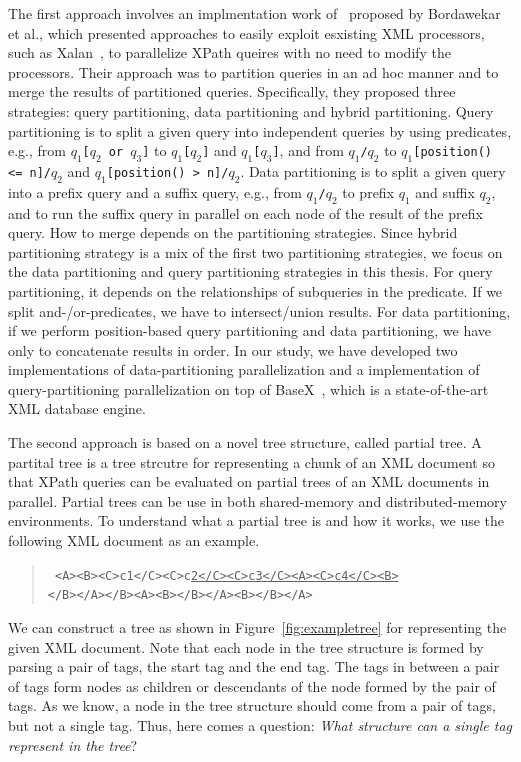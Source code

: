 The first approach involves an implmentation work of~\cite{BoLS09} proposed by
Bordawekar et al., which presented approaches to easily exploit esxisting XML
processors, such as Xalan~\cite{xalan}, to parallelize XPath queires with no
need to modify  the processors. Their approach was to partition queries in an ad
hoc manner and to merge the results of partitioned queries. Specifically, they
proposed three strategies: query partitioning, data partitioning and hybrid
partitioning. Query partitioning is to split a given query into independent
queries by using predicates, e.g., from \texttt{$q_1$[$q_2$ or $q_3$]} to
\texttt{$q_1$[$q_2$]} and \texttt{$q_1$[$q_3$]}, and from \texttt{$q_1$/$q_2$}
to \texttt{$q_1$[position() <= n]/$q_2$} and \texttt{$q_1$[position() >
n]/$q_2$}. Data partitioning is to split a given query into a prefix query and a
suffix query, e.g., from \texttt{$q_1$/$q_2$} to prefix $q_1$ and suffix $q_2$,
and to run the suffix query in parallel on each node of the result of the prefix
query. How to merge depends on the partitioning strategies.  Since hybrid
partitioning strategy is a mix of the first two partitioning strategies, we
focus on the data partitioning and query partitioning strategies in this thesis.
For query partitioning, it depends on the relationships of subqueries in the
predicate. If we split and-/or-predicates, we have to intersect/union results.
For data partitioning, if we perform position-based query partitioning and data
partitioning, we have only to concatenate results in order. In our study, we
have developed two implementations of data-partitioning parallelization and a
implementation of query-partitioning parallelization on top of
BaseX~\cite{basex864}, which is a state-of-the-art XML database engine.

The second approach is based on a novel tree structure, called partial tree. A
partital tree is a tree strcutre for representing a chunk of an XML document so
that XPath queries can be evaluated on partial trees of an XML documents in
parallel. Partial trees can be use in both shared-memory and distributed-memory
environments. To understand what a partial tree is and how it works, we use the
following XML document as an example.

\begin{quote}\small\tt
<A><B><C>c1</C><C>c\underline{2</C><C>c3</C><A><C>c4</C><B>}\\
</B></A></B><A><B></B></A><B></B></A>
\end{quote}

We can construct a tree as shown in Figure~\ref{fig:exampletree} for
representing the given XML document. Note that each node in the tree structure
is formed by parsing a pair of tags, the start tag and the end tag. The tags in
between a pair of tags form nodes as children or descendants of the node formed
by the pair of tags. As we know, a node in the tree structure should come from a
pair of tags, but not a single tag. Thus, here comes a question: \emph{What
structure can a single tag represent in the tree\/}?

